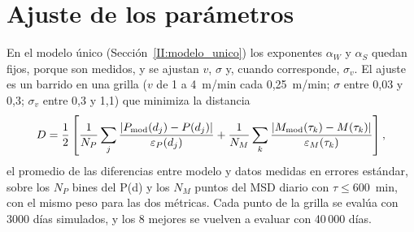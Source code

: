 \section*{Ajuste de los parámetros}

En el modelo único (Sección~\ref{II:modelo_unico}) los exponentes $\alpha_W$ y $\alpha_S$ quedan fijos, porque son medidos, y se ajustan $v$, $\sigma$ y, 
cuando corresponde, $\sigma_v$. El ajuste es un barrido en una grilla ($v$ de 1 a 4~m/min cada 0{,}25~m/min; $\sigma$ entre 0{,}03 y 0{,}3; $\sigma_v$ 
entre 0{,}3 y 1{,}1) que minimiza la distancia
\begin{equation}
    D = \frac{1}{2}\left[\frac{1}{N_P}\sum_{j}\frac{|P_{\rm mod}(d_j) - P(d_j)|}{\varepsilon_P(d_j)} + \frac{1}{N_M}\sum_{k}\frac{|M_{\rm mod}(\tau_k) - M(\tau_k)|}{\varepsilon_M(\tau_k)}\right],
\end{equation}
el promedio de las diferencias entre modelo y datos medidas en errores estándar, sobre los $N_P$ bines del P(d) y los $N_M$ puntos del MSD diario con 
$\tau \le 600$~min, con el mismo peso para las dos métricas. Cada punto de la grilla se evalúa con 3000 días simulados, y los 8 mejores se vuelven a evaluar 
con 40\,000 días. 


